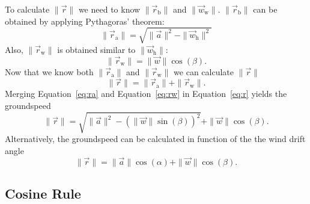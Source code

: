 \documentclass[a4paper,10pt]{article}
\begin{document}
To calculate $\|\vec{r}\|$ we need to know $\|\vec{r}_\mathrm{b}\|$ and $\|\vec{w}_\mathrm{w}\|$.
$\|\vec{r}_\mathrm{b}\|$ can be obtained by applying Pythagoras' theorem:
\begin{equation}
 \|\vec{r}_\mathrm{a}\| = \sqrt{\|\vec{a}\|^2-\|\vec{w}_\mathrm{h}\|^2}\label{eq:ra}
\end{equation}
Also, $\|\vec{r}_\mathrm{w}\|$ is obtained similar to $\|\vec{w}_\mathrm{h}\|$:
\begin{equation}
 \|\vec{r}_\mathrm{w}\| = \|\vec{w}\| \cos(\beta).\label{eq:rw}
\end{equation}
Now that we know both $\|\vec{r}_\mathrm{a}\|$ and $\|\vec{r}_\mathrm{w}\|$ we can calculate $\|\vec{r}\|$
\begin{equation}
 \|\vec{r}\| = \|\vec{r}_\mathrm{a}\| + \|\vec{r}_\mathrm{w}\|.\label{eq:r}
\end{equation}
Merging Equation~\ref{eq:ra} and Equation~\ref{eq:rw} in Equation~\ref{eq:r} yields the groundspeed
\begin{equation}
 \|\vec{r}\| = \sqrt{\|\vec{a}\|^2-\left(\|\vec{w}\| \sin(\beta)\right)^2} + \|\vec{w}\| \cos(\beta).
\end{equation}
Alternatively, the groundspeed can be calculated in function of the the wind drift angle
\begin{equation}
 \|\vec{r}\| = \|\vec{a}\|\cos(\alpha) + \|\vec{w}\| \cos(\beta).
\end{equation}

\subsection{Cosine Rule}
\end{document}
